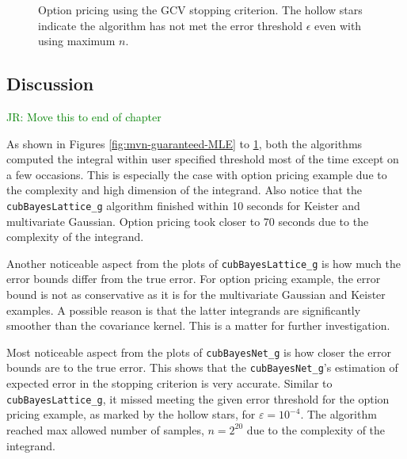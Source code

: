 \documentclass{svjour3}                     %
\newcommand{\code}[1]{\texttt{#1}}
\newcommand{\JRNote}[1]{{\textcolor{green}{JR: #1}}}
\begin{document}
{{{{{{\begin{figure}
\caption[Sobol: Option pricing guaranteed: GCV]{Option pricing using the GCV stopping criterion. The hollow stars indicate the algorithm has not met the error threshold $\epsilon$ even with using maximum $n$.}
\label{fig:Sobol-optprice-guaranteed-GCV}
\end{figure}




\subsection{Discussion}
\JRNote{Move this to end of chapter}

As shown in Figures \ref{fig:mvn-guaranteed-MLE} to \ref{fig:Sobol-optprice-guaranteed-GCV}, both the algorithms computed the integral within user specified threshold most of the time except on a few occasions. This is especially the case with option pricing example due to the complexity and high dimension of the integrand. 
Also notice that the \code{cubBayesLattice\_g} algorithm finished within 10 seconds for Keister and multivariate Gaussian. Option pricing took closer to 70 seconds due to the complexity of the integrand.

Another noticeable aspect from the plots of \code{cubBayesLattice\_g} is how much the error bounds differ from the true error. For option pricing example, the error bound is not as conservative as it is for the multivariate Gaussian and Keister examples. A possible reason is that the latter integrands are significantly smoother than the covariance kernel.  This is a matter for further investigation.





Most noticeable aspect from the plots of \code{cubBayesNet\_g} is how closer the error bounds are to the true error. 
This shows that the \code{cubBayesNet\_g}'s estimation of expected error in the stopping criterion is very accurate. 
Similar to \code{cubBayesLattice\_g}, it missed meeting the given error threshold for the option pricing example, as marked by the hollow stars, for $\varepsilon=10^{-4}$. The algorithm reached max allowed number of samples, $n=2^{20}$ due to the complexity of the integrand.





}}}}}}
\end{document}
